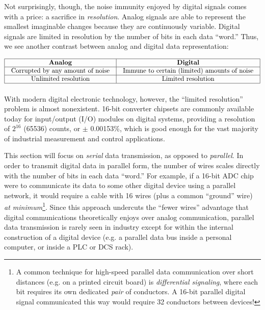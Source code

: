\filbreak

Not surprisingly, though, the noise immunity enjoyed by digital signals comes with a price: a sacrifice in \textit{resolution}.  Analog signals are able to represent the smallest imaginable changes because they are continuously variable.  Digital signals are limited in resolution by the number of bits in each data ``word.''  Thus, we see another contrast between analog and digital data representation:


$$\vbox{\offinterlineskip
\halign{\strut
\vrule \quad\hfil # \ \hfil & 
\vrule \quad\hfil # \ \hfil \vrule \cr
\noalign{\hrule}
%
\textbf{Analog} & \textbf{Digital} \cr
%
\noalign{\hrule}
%
Corrupted by any amount of noise & Immune to certain (limited) amounts of noise \cr
%
\noalign{\hrule}
%
Unlimited resolution & Limited resolution \cr
%
\noalign{\hrule}
} %
}$$ %

With modern digital electronic technology, however, the ``limited resolution'' problem is almost nonexistent.  16-bit converter chipsets are commonly available today for input/output (I/O) modules on digital systems, providing a resolution of $2^{16}$ (65536) counts, or $\pm$ 0.00153\%, which is good enough for the vast majority of industrial measurement and control applications.

\vskip 10pt

This section will focus on \textit{serial} data transmission, as opposed to \textit{parallel}.  In order to transmit digital data in parallel form, the number of wires scales directly with the number of bits in each data ``word.''  For example, if a 16-bit ADC chip were to communicate its data to some other digital device using a parallel network, it would require a cable with 16 wires (plus a common ``ground'' wire) \textit{at minimum}\footnote{A common technique for high-speed parallel data communication over short distances (e.g. on a printed circuit board) is \textit{differential signaling}, where each bit requires its own dedicated \textit{pair} of conductors.  A 16-bit parallel digital signal communicated this way would require 32 conductors between devices!}.  Since this approach undercuts the ``fewer wires'' advantage that digital communications theoretically enjoys over analog communication, parallel data transmission is rarely seen in industry except for within the internal construction of a digital device (e.g. a parallel data bus inside a personal computer, or inside a PLC or DCS rack).    

